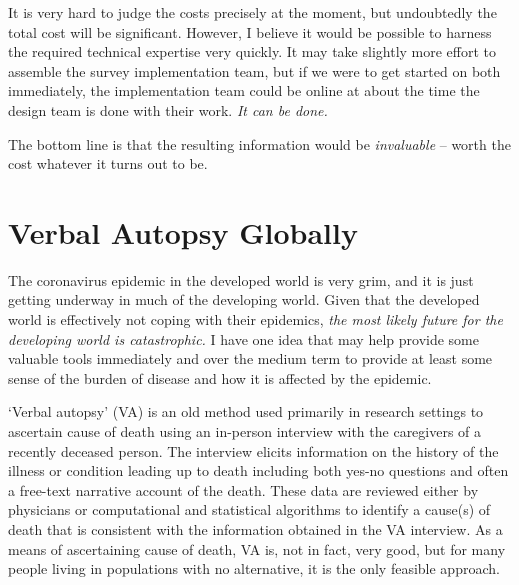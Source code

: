 \documentclass[12pt]{article}
\begin{document}
It is very hard to judge the costs precisely at the moment, but undoubtedly the total cost will be significant. However, I believe it would be possible to harness the required technical expertise very quickly. It may take slightly more effort to assemble the survey implementation team, but if we were to get started on both immediately, the implementation team could be online at about the time the design team is done with their work. \textit{It can be done.}

The bottom line is that the resulting information would be \textit{invaluable} -- worth the cost whatever it turns out to be.



\section{Verbal Autopsy Globally}

The coronavirus epidemic in the developed world is very grim, and it is just getting underway in much of the developing world.  Given that the developed world is effectively not coping with their epidemics, \textit{the most likely future for the developing world is catastrophic.}  I have one idea that may help provide some valuable tools immediately and over the medium term to provide at least some sense of the burden of disease and how it is affected by the epidemic.

`Verbal autopsy' (VA) is an old method used primarily in research settings to ascertain cause of death using an in-person interview with the caregivers of a recently deceased person.  The interview elicits information on the history of the illness or condition leading up to death including both yes-no questions and often a free-text narrative account of the death.  These data are reviewed either by physicians or computational and statistical algorithms to identify a cause(s) of death that is consistent with the information obtained in the VA interview.  As a means of ascertaining cause of death, VA is, not in fact, very good, but for many people living in populations with no alternative, it is the only feasible approach.  
\end{document}

